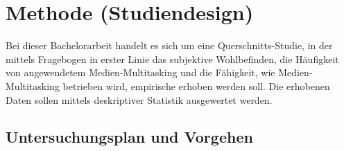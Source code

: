 \section*{Methode (Studiendesign)}\label{section.methode}
Bei dieser Bachelorarbeit handelt es sich um eine Querschnitts-Studie, in der mittels Fragebogen in erster Linie das subjektive Wohlbefinden, die Häufigkeit von angewendetem Medien-Multitasking und die Fähigkeit, wie Medien-Multitasking betrieben wird, empirische erhoben werden soll. Die erhobenen Daten sollen mittels deskriptiver Statistik ausgewertet werden.
\subsection*{Untersuchungsplan und Vorgehen}


